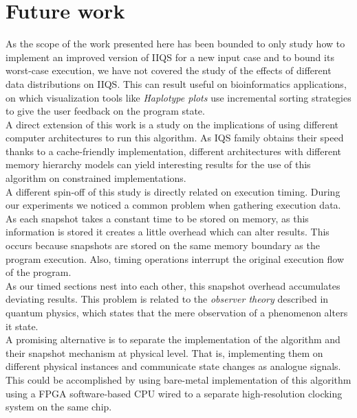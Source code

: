 \section{Future work}

As the scope of the work presented here has been bounded to only study how to implement an improved version of IIQS for a new input case and to bound its worst-case execution, we have not covered the study of the effects of different data distributions on IIQS. This can result useful on bioinformatics applications, on which visualization tools like \emph{Haplotype plots} use incremental sorting strategies to give the user feedback on the program state.\\

A direct extension of this work is a study on the implications of using different computer architectures to run this algorithm. As IQS family obtains their speed thanks to a cache-friendly implementation, different architectures with different memory hierarchy models can yield interesting results for the use of this algorithm on constrained implementations.\\

A different spin-off of this study is directly related on execution timing. During our experiments we noticed a common problem when gathering execution data. As each snapshot takes a constant time to be stored on memory, as this information is stored it creates a little overhead which can alter results. This occurs because snapshots are stored on the same memory boundary as the program execution. Also, timing operations interrupt the original execution flow of the program. \\

As our timed sections nest into each other, this snapshot overhead accumulates deviating results. This problem is related to the \emph{observer theory} described in quantum physics, which states that the mere observation of a phenomenon alters it state. \\

A promising alternative is to separate the implementation of the algorithm and their snapshot mechanism at physical level. That is, implementing them on different physical instances and communicate state changes as analogue signals. This could be accomplished by using bare-metal implementation of this algorithm using a FPGA software-based CPU wired to a separate high-resolution clocking system on the same chip.\\
\FloatBarrier